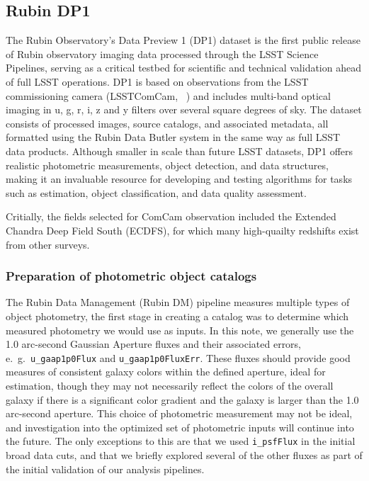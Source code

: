 \subsection{Rubin DP1}
\label{sec:data:dp1}

The Rubin Observatory’s Data Preview 1 (DP1) dataset is the first public release of Rubin observatory imaging data processed through the LSST Science Pipelines, serving as a critical testbed for scientific and technical validation ahead of full LSST operations.  DP1 is based on observations from the LSST commissioning camera (LSSTComCam, ~\citet{10.71929/rubin/2561361}) and includes multi-band optical imaging in u, g, r, i, z and y filters over several square degrees of sky.  The dataset consists of processed images, source catalogs, and associated metadata, all formatted using the Rubin Data Butler system in the same way as full LSST data products.  Although smaller in scale than future LSST datasets, DP1 offers realistic photometric measurements, object detection, and data structures, making it an invaluable resource for developing and testing algorithms for tasks such as \photoz estimation, object classification, and data quality assessment.

Critially, the fields selected for ComCam observation included the Extended Chandra Deep Field South (ECDFS), for which many high-quailty redshifts exist from other surveys. 


\subsubsection{Preparation of photometric object catalogs}
\label{sec:data:dp1:preparation}

The Rubin Data Management (Rubin DM) pipeline measures multiple types of object photometry, the first stage in creating a \photoz catalog was to determine which measured photometry we would use as inputs.  In this note, we generally use the 1.0 arc-second Gaussian Aperture fluxes and their associated errors, e.~g.~\texttt{u\_gaap1p0Flux} and \texttt{u\_gaap1p0FluxErr}.  These fluxes should provide good measures of consistent galaxy colors within the defined aperture, ideal for \photoz estimation, though they may not necessarily reflect the colors of the overall galaxy if there is a significant color gradient and the galaxy is larger than the 1.0 arc-second aperture.  This choice of photometric measurement may not be ideal, and investigation into the optimized set of photometric inputs will continue into the future.   The only exceptions to this are that we used \texttt{i\_psfFlux} in the initial broad data cuts, and that we briefly explored several of the other fluxes as part of the initial validation of our \photoz analysis pipelines. 

